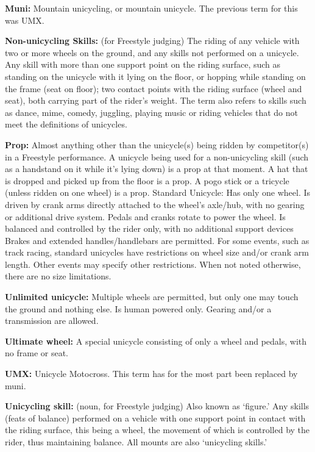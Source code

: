 \textbf{Muni:} Mountain unicycling, or mountain unicycle.
The previous term for this was UMX.

\textbf{Non-unicycling Skills:} (for Freestyle judging) The riding of any vehicle with two or more wheels on the ground, and any skills not performed on a unicycle.
Any skill with more than one support point on the riding surface, such as standing on the unicycle with it lying on the floor, or hopping while standing on the frame (seat on floor); two contact points with the riding surface (wheel and seat), both carrying part of the rider's weight.
The term also refers to skills such as dance, mime, comedy, juggling, playing music or riding vehicles that do not meet the definitions of unicycles.

\textbf{Prop:} Almost anything other than the unicycle(s) being ridden by competitor(s) in a Freestyle performance.
A unicycle being used for a non-unicycling skill (such as a handstand on it while it's lying down) is a prop at that moment.
A hat that is dropped and picked up from the floor is a prop.
A pogo stick or a tricycle (unless ridden on one wheel) is a prop.
{Standard Unicycle:} Has only one wheel.
Is driven by crank arms directly attached to the wheel's axle/hub, with no gearing or additional drive system.
Pedals and cranks rotate to power the wheel.
Is balanced and controlled by the rider only, with no additional support devices Brakes and extended handles/handlebars are permitted.
For some events, such as track racing, standard unicycles have restrictions on wheel size and/or crank arm length.
Other events may specify other restrictions.
When not noted otherwise, there are no size limitations.

\textbf{Unlimited unicycle:} Multiple wheels are permitted, but only one may touch the ground and nothing else.
Is human powered only.
Gearing and/or a transmission are allowed.

\textbf{Ultimate wheel:} A special unicycle consisting of only a wheel and pedals, with no frame or seat.

\textbf{UMX:} Unicycle Motocross.
This term has for the most part been replaced by muni.

\textbf{Unicycling skill:} (noun, for Freestyle judging) Also known as `figure.' Any skills (feats of balance) performed on a vehicle with one support point in contact with the riding surface, this being a wheel, the movement of which is controlled by the rider, thus maintaining balance.
All mounts are also `unicycling skills.' 

